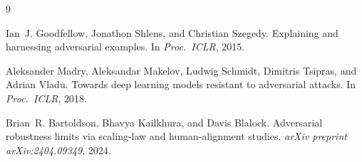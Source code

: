 \documentclass[11pt,a4paper]{article}
\begin{document}

\begin{thebibliography}{9}

Ian~J. Goodfellow, Jonathon Shlens, and Christian Szegedy.
\newblock Explaining and harnessing adversarial examples.
\newblock In \emph{Proc.\ ICLR}, 2015.

Aleksander Madry, Aleksandar Makelov, Ludwig Schmidt, Dimitris Tsipras, and Adrian Vladu.
\newblock Towards deep learning models resistant to adversarial attacks.
\newblock In \emph{Proc.\ ICLR}, 2018.

Brian~R. Bartoldson, Bhavya Kailkhura, and Davis Blalock.
\newblock Adversarial robustness limits via scaling-law and human-alignment studies.
\newblock \emph{arXiv preprint arXiv:2404.09349}, 2024.

\end{thebibliography}
\end{document}
